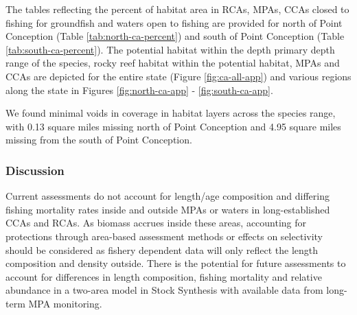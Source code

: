 \documentclass[11pt,
  english,
  a4paper,
]{article}
\begin{document}

The tables reflecting the percent of habitat area in RCAs, MPAs, CCAs closed to fishing for groundfish and waters open to fishing are provided for north of Point Conception (Table \ref{tab:north-ca-percent}) and south of Point Conception (Table \ref{tab:south-ca-percent}). The potential habitat within the depth primary depth range of the species, rocky reef habitat within the potential habitat, MPAs and CCAs are depicted for the entire state (Figure \ref{fig:ca-all-app}) and various regions along the state in Figures \ref{fig:north-ca-app} - \ref{fig:south-ca-app}.

\leavevmode\tagmcend\tagstructend\par


We found minimal voids in coverage in habitat layers across the species range, with 0.13 square miles missing north of Point Conception and 4.95 square miles missing from the south of Point Conception.

\leavevmode\tagmcend\tagstructend\par


\hypertarget{discussion}{%
\subsubsection{Discussion}\label{discussion}}

\leavevmode\tagmcend\tagstructend


Current assessments do not account for length/age composition and differing fishing mortality rates inside and outside MPAs or waters in long-established CCAs and RCAs. As biomass accrues inside these areas, accounting for protections through area-based assessment methods or effects on selectivity should be considered as fishery dependent data will only reflect the length composition and density outside. There is the potential for future assessments to account for differences in length composition, fishing mortality and relative abundance in a two-area model in Stock Synthesis with available data from long-term MPA monitoring.

\leavevmode\tagmcend\tagstructend\par

\end{document}
